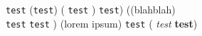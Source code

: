 \documentclass{article}
\begin{document}
\texttt{test}
(\texttt{test})
(  \texttt{test}   )
\texttt{test})
((blahblah)\\
\texttt{test}
\texttt{test}
)
(lorem ipsum)
\texttt{test}
( \textit{test} \textbf{test})
\end{document}
